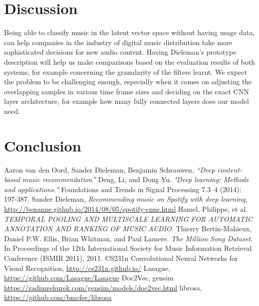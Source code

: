 \documentclass[11pt, a4paper]{article}
\begin{document}
  \section{Discussion}
    Being able to classify music in the latent vector space without having
    usage data, can help companies in the industry of digital music
    distribution take more sophisticated decisions for new audio content.
    Having Dieleman's prototype description will help us make comparisons based
    on the evaluation results of both systems, for example concerning the
    granularity of the filters learnt. We expect the problem to be challenging
    enough, especially when it comes on adjusting the overlapping samples in
    various time frame sizes and deciding on the exact CNN layer architecture,
    for example how many fully connected layers does our model need.
  \section{Conclusion}

  \begin{thebibliography}{9}
    \sf
      Aaron van den Oord, Sander Dieleman, Benjamin Schrauwen, \emph{``Deep
      content-based music recommendation''}
      Deng, Li, and Dong Yu. \emph{"Deep learning: Methods and applications."}
      Foundations and Trends in Signal Processing 7.3–4 (2014): 197-387.
      Sander Dieleman, \emph{Recommending music on Spotify with deep learning},
      \url{http://benanne.github.io/2014/08/05/spotify-cnns.html}
      Hamel, Philippe, et al. \emph{TEMPORAL POOLING AND MULTISCALE LEARNING
      FOR AUTOMATIC ANNOTATION AND RANKING OF MUSIC AUDIO}.
      Thierry Bertin-Mahieux, Daniel P.W. Ellis, Brian Whitman, and Paul
      Lamere. \emph{The Million Song Dataset}. In Proceedings of the 12th
      International Society for Music Information Retrieval Conference (ISMIR
      2011), 2011.
      CS231n Convolutional Neural Networks for Visual Recognition,
      \url{http://cs231n.github.io/}
      Lasagne, \url{https://github.com/Lasagne/Lasagne}
      Doc2Vec, gensim \url{https://radimrehurek.com/gensim/models/doc2vec.html}
      librosa, \url{https://github.com/bmcfee/librosa}
  \end{thebibliography}
\end{document}
